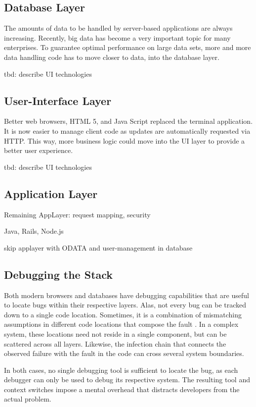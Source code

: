 \subsection{Database Layer}

The amounts of data to be handled by server-based applications are always increasing.
Recently, big data has become a very important topic for many enterprises.
To guarantee optimal performance on large data sets, more and more data handling code has to move closer to data, into the database layer.

tbd: describe UI technologies

\subsection{User-Interface Layer}

Better web browsers, HTML 5, and Java Script replaced the terminal application.
It is now easier to manage client code as updates are automatically requested via HTTP.
This way, more business logic could move into the UI layer to provide a better user experience.

tbd: describe UI technologies

\subsection{Application Layer}

Remaining AppLayer: request mapping, security

Java, Rails, Node.js

skip applayer with ODATA and user-management in database

\subsection{Debugging the Stack}

Both modern browsers and databases have debugging capabilities that are useful to locate bugs within their respective layers.
Alas, not every bug can be tracked down to a single code location. 
Sometimes, it is a combination of mismatching assumptions in different code locations that compose the fault .
In a complex system, these locations need not reside in a single component, but can be scattered across all layers.
Likewise, the infection chain that connects the observed failure with the fault in the code can cross several system boundaries.

In both cases, no single debugging tool is sufficient to locate the bug, as each debugger can only be used to debug its respective system.
The resulting tool and context switches impose a mental overhead that distracts developers from the actual problem.

